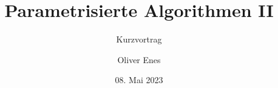 
\newcommand{\BigO}[1]{\ensuremath{\operatorname{\mathcal{O}}\bigl(#1\bigr)}}

\newcommand{\cloud}[1]{
    \begin{tikzpicture}
 
        \node[cloud,
            fill = gray!10,
            minimum width = 3cm,
            minimum height = 2cm] (c) at (0,0) {#1};
         
    \end{tikzpicture}
}

\documentclass[navbaroff]{sdqbeamer} 
\usepackage{tikz}
 

\grouplogo{} 



\title[Parametrisierte Algorithmen II]{Parametrisierte Algorithmen II}
\subtitle{Kurzvortrag} 
\author[Oliver Enes]{Oliver Enes}

\date[08.\,05.\,2023]{08. Mai 2023}

 
\usepackage[citestyle=authoryear,bibstyle=numeric,hyperref,backend=biber]{biblatex}

\bibhang1em

=[circle, draw, fill=black!50, inner sep=0pt, minimum width=4pt]
\usetikzlibrary{graphs,graphs.standard}
\usetikzlibrary{calc,shapes.callouts,shapes.arrows}



 
\KITtitleframe

